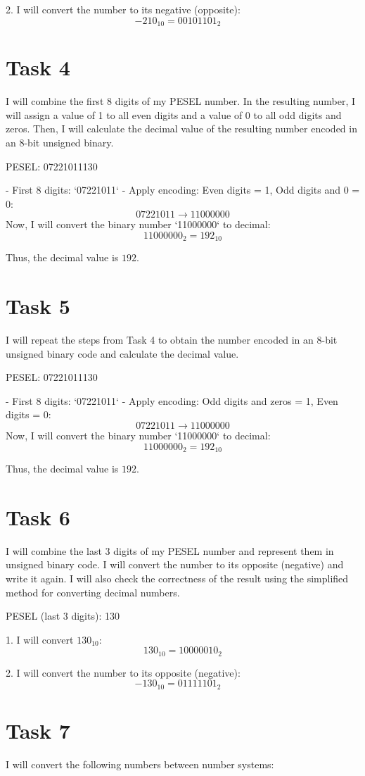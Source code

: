 \documentclass{article}
\begin{document}
2. I will convert the number to its negative (opposite):
   \[
   -210_{10} = 00101101_2 \quad
   \]

\section*{Task 4}
I will combine the first 8 digits of my PESEL number. In the resulting number, I will assign a value of 1 to all even digits and a value of 0 to all odd digits and zeros. Then, I will calculate the decimal value of the resulting number encoded in an 8-bit unsigned binary.

PESEL: 07221011130

- First 8 digits: `07221011`
- Apply encoding: Even digits = 1, Odd digits and 0 = 0:
\[
07221011 \rightarrow 11000000
\]
Now, I will convert the binary number `11000000` to decimal:
\[
11000000_2 = 192_{10}
\]

Thus, the decimal value is \( 192 \).

\section*{Task 5}
I will repeat the steps from Task 4 to obtain the number encoded in an 8-bit unsigned binary code and calculate the decimal value.

PESEL: 07221011130

- First 8 digits: `07221011`
- Apply encoding: Odd digits and zeros = 1, Even digits = 0:
\[
07221011 \rightarrow 11000000
\]
Now, I will convert the binary number `11000000` to decimal:
\[
11000000_2 = 192_{10}
\]

Thus, the decimal value is \( 192 \).

\section*{Task 6}
I will combine the last 3 digits of my PESEL number and represent them in unsigned binary code. I will convert the number to its opposite (negative) and write it again. I will also check the correctness of the result using the simplified method for converting decimal numbers.

PESEL (last 3 digits): 130

1. I will convert \( 130_{10} \):
   \[
   130_{10} = 10000010_2
   \]

2. I will convert the number to its opposite (negative):
   \[
   -130_{10} = 01111101_2 \quad 
   \]

\section*{Task 7}
I will convert the following numbers between number systems:
\end{document}
